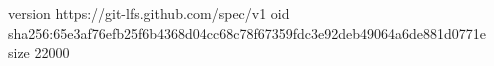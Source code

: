version https://git-lfs.github.com/spec/v1
oid sha256:65e3af76efb25f6b4368d04cc68c78f67359fdc3e92deb49064a6de881d0771e
size 22000

